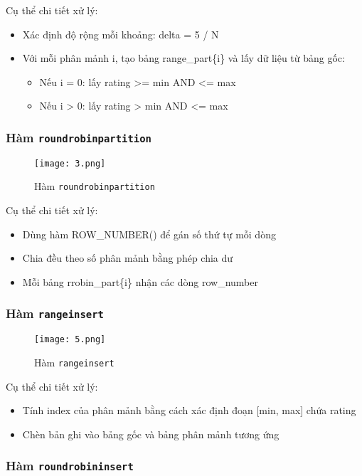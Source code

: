 \documentclass[a4paper]{article}
\begin{document}
Cụ thể chi tiết xử lý:
\begin{itemize}
    \item Xác định độ rộng mỗi khoảng: delta = 5 / N
    \item Với mỗi phân mảnh i, tạo bảng range\_part\{i\} và lấy dữ liệu từ bảng gốc:
    \begin{itemize}
        \item Nếu i = 0: lấy rating >= min AND <= max
        \item Nếu i > 0: lấy rating > min AND <= max
    \end{itemize}
\end{itemize}

\subsubsection{Hàm \texttt{roundrobinpartition}}
\begin{figure}[H]
    \centering
    \texttt{[image: 3.png]}
    \caption{Hàm \texttt{roundrobinpartition}}

\end{figure}

Cụ thể chi tiết xử lý:
\begin{itemize}
    \item Dùng hàm ROW\_NUMBER() để gán số thứ tự mỗi dòng
    \item Chia đều theo số phân mảnh bằng phép chia dư %
    \item Mỗi bảng rrobin\_part\{i\} nhận các dòng row\_number %
\end{itemize}

\subsubsection{Hàm \texttt{rangeinsert}}
\begin{figure}[H]
    \centering
    \texttt{[image: 5.png]}
    \caption{Hàm \texttt{rangeinsert}}

\end{figure}

Cụ thể chi tiết xử lý:
\begin{itemize}
    \item Tính index của phân mảnh bằng cách xác định đoạn [min, max] chứa rating
    \item Chèn bản ghi vào bảng gốc và bảng phân mảnh tương ứng
\end{itemize}

\subsubsection{Hàm \texttt{roundrobininsert}}
\end{document}
